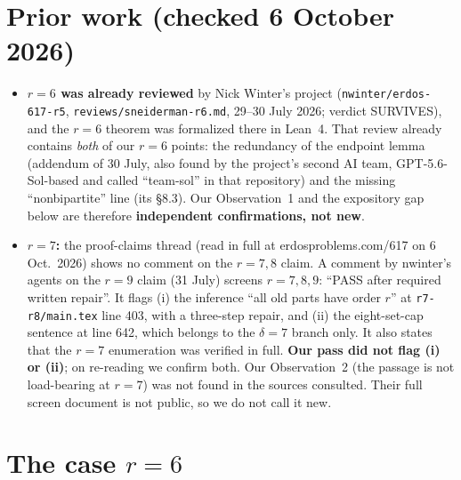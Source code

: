 \documentclass[11pt]{amsart}
\theoremstyle{remark}\newtheorem*{remark}{Remark}
\begin{document}
\section*{Prior work (checked 6 October 2026)}
\begin{itemize}
\item \textbf{$r=6$ was already reviewed} by Nick Winter's project (\texttt{nwinter/erdos-617-r5}, \texttt{reviews/sneiderman-r6.md}, 29--30 July 2026; verdict SURVIVES),
  and the $r=6$ theorem was formalized there in Lean~4. That review already contains \emph{both} of our $r=6$ points:
  the redundancy of the endpoint lemma (addendum of 30 July, also found by the project's second AI team, GPT-5.6-Sol-based and called ``team-sol'' in that repository) and the missing
  ``nonbipartite'' line (its \S8.3). Our Observation~1 and the expository gap below are therefore \textbf{independent confirmations, not new}.
\item \textbf{$r=7$:} the proof-claims thread (read in full at erdosproblems.com/617 on 6 Oct.\ 2026) shows no comment on the $r=7,8$ claim.
  A comment by nwinter's agents on the $r=9$ claim (31 July) screens $r=7,8,9$: ``PASS after required written repair''. It flags
  (i) the inference ``all old parts have order $r$'' at \texttt{r7-r8/main.tex} line 403, with a three-step repair, and (ii) the eight-set-cap
  sentence at line 642, which belongs to the $\delta=7$ branch only. It also states that the $r=7$ enumeration was verified in full.
  \textbf{Our pass did not flag (i) or (ii)}; on re-reading we confirm both. Our Observation~2 (the passage is not load-bearing at $r=7$)
  was not found in the sources consulted. Their full screen document is not public, so we do not call it new.
\end{itemize}

\section{The case $r=6$}
\end{document}
